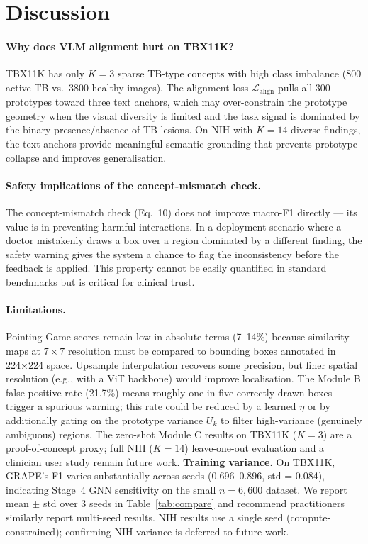\documentclass{article}
\begin{document}
\section{Discussion}
\label{sec:discussion}

\paragraph{Why does VLM alignment hurt on TBX11K?}
TBX11K has only $K=3$ sparse TB-type concepts with high class imbalance (800 active-TB vs.\ 3800 healthy images). The alignment loss $\mathcal{L}_\text{align}$ pulls all 300 prototypes toward three text anchors, which may over-constrain the prototype geometry when the visual diversity is limited and the task signal is dominated by the binary presence/absence of TB lesions. On NIH with $K=14$ diverse findings, the text anchors provide meaningful semantic grounding that prevents prototype collapse and improves generalisation.

\paragraph{Safety implications of the concept-mismatch check.}
The concept-mismatch check (Eq.~10) does not improve macro-F1 directly — its value is in preventing harmful interactions. In a deployment scenario where a doctor mistakenly draws a box over a region dominated by a different finding, the safety warning gives the system a chance to flag the inconsistency before the feedback is applied. This property cannot be easily quantified in standard benchmarks but is critical for clinical trust.

\paragraph{Limitations.}
Pointing Game scores remain low in absolute terms (7–14\%) because similarity maps at $7 \times 7$ resolution must be compared to bounding boxes annotated in 224×224 space. Upsample interpolation recovers some precision, but finer spatial resolution (e.g., with a ViT backbone) would improve localisation. The Module B false-positive rate (21.7\%) means roughly one-in-five correctly drawn boxes trigger a spurious warning; this rate could be reduced by a learned $\eta$ or by additionally gating on the prototype variance $U_k$ to filter high-variance (genuinely ambiguous) regions. The zero-shot Module C results on TBX11K ($K=3$) are a proof-of-concept proxy; full NIH ($K=14$) leave-one-out evaluation and a clinician user study remain future work.
\textbf{Training variance.} On TBX11K, GRAPE's F1 varies substantially across seeds (0.696--0.896, std = 0.084), indicating Stage~4 GNN sensitivity on the small $n=6{,}600$ dataset. We report mean $\pm$ std over 3 seeds in Table~\ref{tab:compare} and recommend practitioners similarly report multi-seed results. NIH results use a single seed (compute-constrained); confirming NIH variance is deferred to future work.
\end{document}
